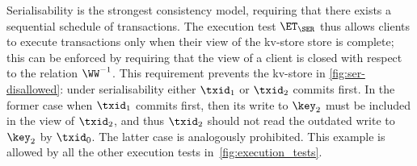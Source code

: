 
Serialisability is the strongest consistency model, requiring that there exists a sequential schedule of transactions. 
The execution test $\ET_{\SER}$ thus allows clients to execute transactions only when 
their view of the kv-store store is complete; this can be enforced by requiring that the view 
of a client is closed with respect to the relation $\WW^{-1}$.
This requirement prevents the kv-store in  \cref{fig:ser-disallowed}: under serialisability either $\txid_1$ or $\txid_2$ commits first.
In the former case when $\txid_1$ commits first, then its write to $\key_2$ must be included in the view of $\txid_2$, and thus $\txid_2$ should not read the outdated write to $\key_2$ by $\txid_0$. 
The latter case is analogously prohibited. 
This example is allowed by all the other execution tests in~\cref{fig:execution_tests}.

